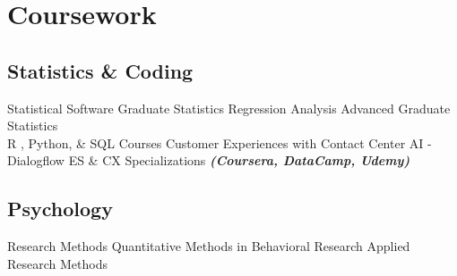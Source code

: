 \documentclass[letterpaper]{deedy-resume_sm} %
\begin{document}
\section{Coursework}
\subsection{Statistics \& Coding}
Statistical Software \textbullet{} 
Graduate Statistics \textbullet{} 
Regression Analysis \textbullet{} 
Advanced Graduate Statistics %
\\
R , Python, \& SQL Courses \textbullet{} 
Customer Experiences with Contact Center AI - Dialogflow ES \& CX Specializations {\footnotesize \textit{\textbf{(Coursera, DataCamp, Udemy)}}}
\subsection{Psychology}
Research Methods \textbullet{} 
Quantitative Methods in Behavioral Research \textbullet{} 
Applied Research Methods %
\end{document}
